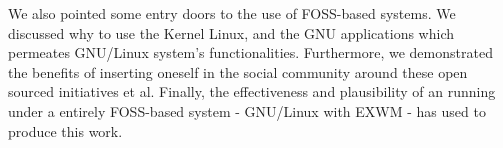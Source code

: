 \documentclass[
12pt,				%
openright,			%
oneside,			%
a4paper,			%
brazil,				%
english,			  %
]{abntex2}
\begin{document}
We also pointed some entry doors to the use of FOSS-based systems. We
discussed why to use the Kernel Linux, and the GNU applications which
permeates GNU/Linux system's functionalities. Furthermore, we demonstrated
the benefits of inserting oneself in the social community around these
open sourced initiatives et al. Finally, the effectiveness and
plausibility of an running under a entirely FOSS-based system -
GNU/Linux with EXWM - has used to produce this work. 


\end{document}

